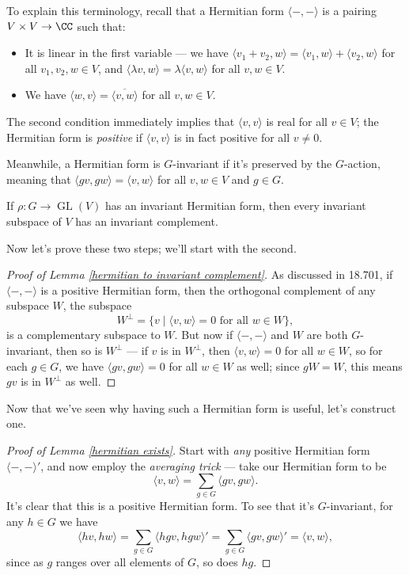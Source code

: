 To explain this terminology, recall that a Hermitian form $\langle -, -\rangle$ is a pairing $V \times V \to \CC$ such that: 
\begin{itemize}
    \item It is linear in the first variable --- we have $\langle v_1 + v_2, w \rangle = \langle v_1, w\rangle + \langle v_2, w\rangle$ for all $v_1, v_2, w \in V$, and $\langle \lambda v, w \rangle = \lambda \langle v, w \rangle$ for all $v, w \in V$.
    \item We have $\langle w, v \rangle = \overline{\langle v, w \rangle}$ for all $v, w \in V$. 
\end{itemize}
The second condition immediately implies that $\langle v, v \rangle$ is real for all $v \in V$; the Hermitian form is \emph{positive} if $\langle v, v \rangle$ is in fact positive for all $v \neq 0$. 

Meanwhile, a Hermitian form is $G$-invariant if it's preserved by the $G$-action, meaning that $\langle gv, gw \rangle = \langle v, w \rangle$ for all $v, w \in V$ and $g \in G$. 

\begin{lemma} \label{hermitian to invariant complement}
If $\rho : G \to \operatorname{GL}(V)$ has an invariant Hermitian form, then every invariant subspace of $V$ has an invariant complement. 
\end{lemma}

Now let's prove these two steps; we'll start with the second. 

\begin{proof}[Proof of Lemma \ref{hermitian to invariant complement}]
As discussed in 18.701, if $\langle -, -\rangle$ is a positive Hermitian form, then the orthogonal complement of any subspace $W$, the subspace \[W^\perp = \{v \mid \langle v, w \rangle = 0 \text{ for all $w \in W$}\},\] is a complementary subspace to $W$. But now if $\langle -, -\rangle$ and $W$ are both $G$-invariant, then so is $W^\perp$ --- if $v$ is in $W^\perp$, then $\langle v, w \rangle = 0$ for all $w \in W$, so for each $g \in G$, we have $\langle gv, gw \rangle = 0$ for all $w \in W$ as well; since $gW = W$, this means $gv$ is in $W^\perp$ as well. 
\end{proof}

Now that we've seen why having such a Hermitian form is useful, let's construct one. 

\begin{proof}[Proof of Lemma \ref{hermitian exists}]
    Start with \emph{any} positive Hermitian form $\langle -, -\rangle'$, and now employ the \emph{averaging trick} --- take our Hermitian form to be \[\langle v, w \rangle = \sum_{g \in G} \langle gv, gw \rangle.\] It's clear that this is a positive Hermitian form. To see that it's $G$-invariant, for any $h \in G$ we have \[\langle hv, hw \rangle = \sum_{g \in G} \langle hgv, hgw \rangle' = \sum_{g \in G} \langle gv, gw \rangle' = \langle v, w\rangle,\] since as $g$ ranges over all elements of $G$, so does $hg$.  
\end{proof}

